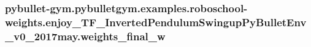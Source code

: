 \subsubsection[{\texorpdfstring{weights\+\_\+final\+\_\+w}{weights_final_w}}]{\setlength{\rightskip}{0pt plus 5cm}pybullet-\/gym.\+pybulletgym.\+examples.\+roboschool-\/weights.\+enjoy\+\_\+\+T\+F\+\_\+\+Inverted\+Pendulum\+Swingup\+Py\+Bullet\+Env\+\_\+v0\+\_\+2017may.\+weights\+\_\+final\+\_\+w}\hypertarget{namespacepybullet-gym_1_1pybulletgym_1_1examples_1_1roboschool-weights_1_1enjoy___t_f___inverted49df41add915758d6f92d022ad22e9f0_ae7f0c155a0ce26773365327c87c4d3cd}{}\label{namespacepybullet-gym_1_1pybulletgym_1_1examples_1_1roboschool-weights_1_1enjoy___t_f___inverted49df41add915758d6f92d022ad22e9f0_ae7f0c155a0ce26773365327c87c4d3cd}
